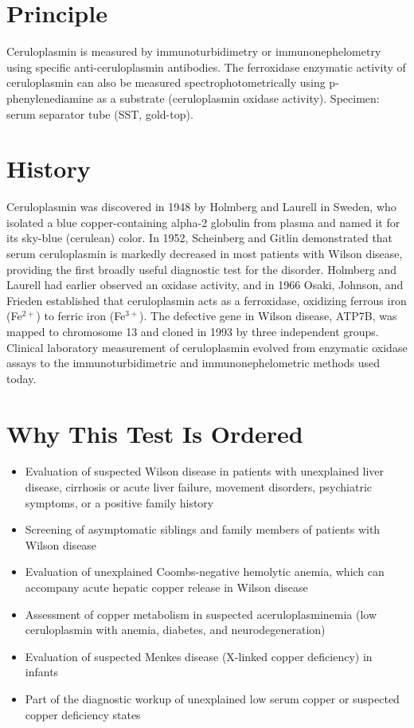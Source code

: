 \section*{Principle}
Ceruloplasmin is measured by immunoturbidimetry or immunonephelometry using specific anti-ceruloplasmin antibodies. The ferroxidase enzymatic activity of ceruloplasmin can also be measured spectrophotometrically using p-phenylenediamine as a substrate (ceruloplasmin oxidase activity). Specimen: serum separator tube (SST, gold-top).
\section*{History}
Ceruloplasmin was discovered in 1948 by Holmberg and Laurell in Sweden, who isolated a blue copper-containing alpha-2 globulin from plasma and named it for its sky-blue (cerulean) color. In 1952, Scheinberg and Gitlin demonstrated that serum ceruloplasmin is markedly decreased in most patients with Wilson disease, providing the first broadly useful diagnostic test for the disorder. Holmberg and Laurell had earlier observed an oxidase activity, and in 1966 Osaki, Johnson, and Frieden established that ceruloplasmin acts as a ferroxidase, oxidizing ferrous iron (Fe$^{2+}$) to ferric iron (Fe$^{3+}$). The defective gene in Wilson disease, ATP7B, was mapped to chromosome 13 and cloned in 1993 by three independent groups. Clinical laboratory measurement of ceruloplasmin evolved from enzymatic oxidase assays to the immunoturbidimetric and immunonephelometric methods used today.
\section*{Why This Test Is Ordered}
\begin{itemize}
  \item Evaluation of suspected Wilson disease in patients with unexplained liver disease, cirrhosis or acute liver failure, movement disorders, psychiatric symptoms, or a positive family history
  \item Screening of asymptomatic siblings and family members of patients with Wilson disease
  \item Evaluation of unexplained Coombs-negative hemolytic anemia, which can accompany acute hepatic copper release in Wilson disease
  \item Assessment of copper metabolism in suspected aceruloplasminemia (low ceruloplasmin with anemia, diabetes, and neurodegeneration)
  \item Evaluation of suspected Menkes disease (X-linked copper deficiency) in infants
  \item Part of the diagnostic workup of unexplained low serum copper or suspected copper deficiency states
\end{itemize}

